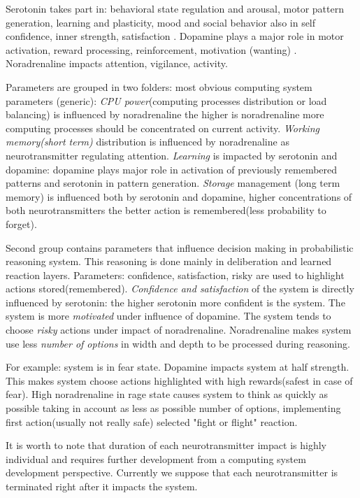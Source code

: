 Serotonin takes part in: behavioral state regulation and arousal, motor pattern generation, learning and plasticity, mood and social behavior \cite{anatomic} also in self confidence, inner strength, satisfaction \cite{cubeofemotions}. Dopamine plays a major role in motor activation, reward processing, reinforcement, motivation (wanting) \cite{cubeofemotions, emotionsbraintorobot, roleofemotions}. Noradrenaline impacts attention, vigilance, activity\cite{cubeofemotions}.

Parameters are grouped in two folders: most obvious computing system parameters (generic):
\emph{CPU power}(computing processes distribution or load balancing) is influenced by noradrenaline the higher is noradrenaline more computing processes should be concentrated on current activity.
\emph{Working memory(short term)} distribution is influenced by noradrenaline as neurotransmitter regulating attention.
\emph{Learning} is impacted by serotonin and dopamine: dopamine plays major role in activation of previously remembered patterns and serotonin in pattern generation.
\emph{Storage} management (long term memory) is influenced both by serotonin and dopamine, higher concentrations of both neurotransmitters the better action is remembered(less probability to forget).

Second group contains parameters that influence decision making in probabilistic reasoning system. This reasoning is done mainly in deliberation and learned reaction layers.
Parameters: confidence, satisfaction, risky are used to highlight actions stored(remembered).
\emph{Confidence and satisfaction} of the system is directly influenced by serotonin: the higher serotonin more confident is the system. 
The system is more \emph{motivated} under influence of dopamine.
The system tends to choose \emph{risky} actions under impact of noradrenaline.
Noradrenaline makes system use less \emph{number of options} in width and depth to be processed during reasoning.

For example: system is in fear state. Dopamine impacts system at half strength. This makes system choose actions highlighted with high rewards(safest in case of fear). High noradrenaline in rage state causes system to think as quickly as possible taking in account as less as possible number of options, implementing first action(usually not really safe) selected "fight or flight" reaction.

It is worth to note that duration of each neurotransmitter impact is highly individual and requires further development from a computing system development perspective. Currently we suppose that each neurotransmitter is terminated right after it impacts the system.

